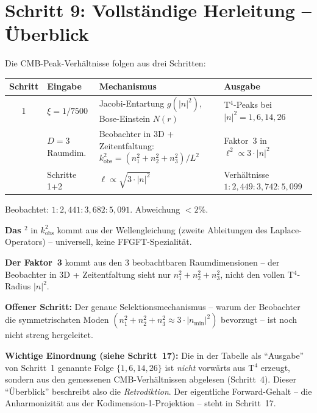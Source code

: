 \section{Schritt 9: Vollständige Herleitung -- Überblick}

Die CMB-Peak-Verhältnisse folgen aus drei Schritten:

\begin{center}
\begin{tabular}{c p{2.1cm} p{6.3cm} p{3.8cm}}
\toprule
Schritt & Eingabe & Mechanismus & Ausgabe \\
\midrule
1 & $\xi = 1/7500$ &
  Jacobi-Entartung $g(|n|^2)$, Bose-Einstein $N(r)$ &
  T$^4$-Peaks bei $|n|^2 = 1, 6, 14, 26$ \\
\addlinespace
2 & $D = 3$ Raumdim. &
  Beobachter in 3D + Zeitentfaltung:
  $k_\mathrm{obs}^2 = (n_1^2+n_2^2+n_3^2)/L^2$ &
  Faktor~3 in $\ell^2 \propto 3\cdot|n|^2$ \\
\addlinespace
3 & Schritte 1+2 &
  $\ell \propto \sqrt{3\cdot|n|^2}$ &
  Verhältnisse $1:2{,}449:3{,}742:5{,}099$ \\
\bottomrule
\end{tabular}
\end{center}

Beobachtet: $1:2{,}441:3{,}682:5{,}091$. Abweichung $< 2\%$.

\textbf{Das $^2$} in $k_\mathrm{obs}^2$ kommt aus der Wellengleichung
(zweite Ableitungen des Laplace-Operators) -- universell, keine FFGFT-Spezialität.

\textbf{Der Faktor~3} kommt aus den 3 beobachtbaren Raumdimensionen --
der Beobachter in 3D + Zeitentfaltung sieht nur $n_1^2+n_2^2+n_3^2$,
nicht den vollen T$^4$-Radius $|n|^2$.

\textbf{Offener Schritt:} Der genaue Selektionsmechanismus --
warum der Beobachter die symmetrischsten Moden
$(n_1^2+n_2^2+n_3^2 \approx 3\cdot|n_\mathrm{min}|^2)$ bevorzugt --
ist noch nicht streng hergeleitet.

\textbf{Wichtige Einordnung (siehe Schritt~17):} Die in der Tabelle als
``Ausgabe'' von Schritt~1 genannte Folge $\{1,6,14,26\}$ ist \emph{nicht}
vorwärts aus T$^4$ erzeugt, sondern aus den gemessenen CMB-Verhältnissen
abgelesen (Schritt~4). Dieser ``Überblick'' beschreibt also die
\emph{Retrodiktion}. Der eigentliche Forward-Gehalt -- die Anharmonizität
aus der Kodimension-1-Projektion -- steht in Schritt~17.

